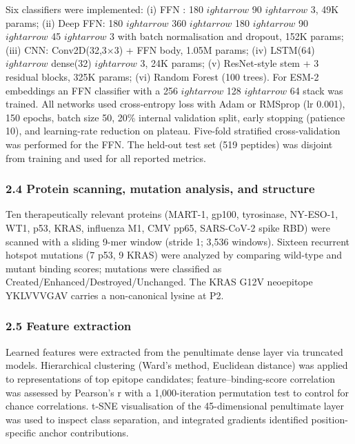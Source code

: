 \documentclass[10pt]{article}
\begin{document}
Six classifiers were implemented: (i) FFN \cite{Nielsen03}:
180 $
ightarrow$ 90 $
ightarrow$ 3, 49K params; (ii) Deep FFN: 180 $
ightarrow$ 360 $
ightarrow$ 180 $
ightarrow$ 90 $
ightarrow$ 45 $
ightarrow$ 3 with batch
normalisation and dropout, 152K params; (iii) CNN: Conv2D(32,3$\times$3) + FFN
body, 1.05M params; (iv) LSTM(64) $
ightarrow$ dense(32) $
ightarrow$ 3, 24K params; (v)
ResNet-style stem + 3 residual blocks, 325K params; (vi) Random Forest
(100 trees). For ESM-2 embeddings an FFN classifier with a 256 $
ightarrow$ 128 $
ightarrow$ 64
stack was trained. All networks used cross-entropy loss with Adam or
RMSprop (lr 0.001), 150 epochs, batch size 50, 20\% internal validation
split, early stopping (patience 10), and learning-rate reduction on
plateau. Five-fold stratified cross-validation was performed for the
FFN. The held-out test set (519 peptides) was disjoint from training and
used for all reported metrics.

\subsubsection{2.4 Protein scanning, mutation analysis, and
structure}\label{protein-scanning-mutation-analysis-and-structure}

Ten therapeutically relevant proteins (MART-1, gp100, tyrosinase,
NY-ESO-1, WT1, p53, KRAS, influenza M1, CMV pp65, SARS-CoV-2 spike RBD)
were scanned with a sliding 9-mer window (stride 1; 3,536 windows).
Sixteen recurrent hotspot mutations (7 p53, 9 KRAS) were analyzed by
comparing wild-type and mutant binding scores; mutations were classified
as Created/Enhanced/Destroyed/Unchanged. The KRAS G12V neoepitope
YKLVVVGAV carries a non-canonical lysine at P2.

\subsubsection{2.5 Feature extraction}\label{feature-extraction}

Learned features were extracted from the penultimate dense layer via
truncated models. Hierarchical clustering (Ward's method, Euclidean
distance) was applied to representations of top epitope candidates;
feature--binding-score correlation was assessed by Pearson's r with a
1,000-iteration permutation test to control for chance correlations.
t-SNE visualisation of the 45-dimensional penultimate layer was used to
inspect class separation, and integrated gradients identified
position-specific anchor contributions.
\end{document}
